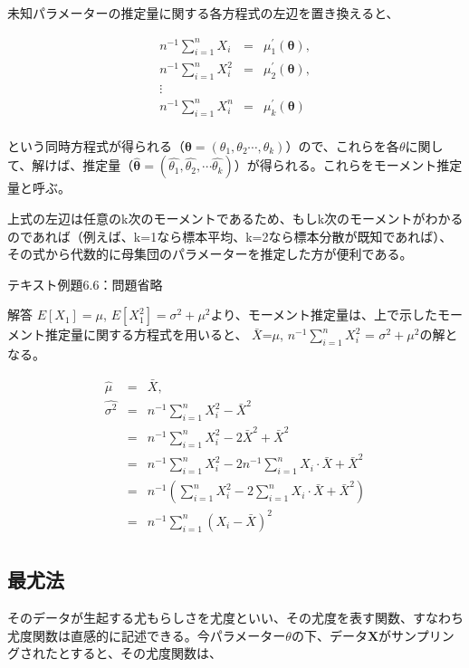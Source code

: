 \documentclass[a4paper,uplatex]{jsarticle}
\begin{document}
未知パラメーターの推定量に関する各方程式の左辺を置き換えると、

\begin{eqnarray*}
  n^{-1}\sum_{i=1}^{n}X_{i} & = & \mu_{1}^{\prime}(\bm{\theta}),  \\
  n^{-1}\sum_{i=1}^{n}X_{i}^{2} & = & \mu_{2}^{\prime}(\bm{\theta}), \\
  \vdots \\
  n^{-1}\sum_{i=1}^{n}X_{i}^{n} & = & \mu_{k}^{\prime}(\bm{\theta}) \\
\end{eqnarray*}

という同時方程式が得られる（$\bm{\theta}=(\theta_1, \theta_2 \cdots ,\theta_k)$）ので、これらを各$\theta$に関して、解けば、推定量（$\bm{\hat{\theta}}=(\hat{\theta_1}, \hat{\theta_2}, \cdots \hat{\theta_k})$）が得られる。これらをモーメント推定量と呼ぶ。

上式の左辺は任意のk次のモーメントであるため、もしk次のモーメントがわかるのであれば（例えば、k=1なら標本平均、k=2なら標本分散が既知であれば）、その式から代数的に母集団のパラメーターを推定した方が便利である。

\vspace{\baselineskip}
テキスト例題6.6：問題省略

\begin{itembox}[c]{解答}
  $E[X_1]=\mu$,  $E[X_1^2]=\sigma^2+\mu^2$より、モーメント推定量は、上で示したモーメント推定量に関する方程式を用いると、
  $\bar{X}$=$\mu$, $n^{-1}\sum_{i=1}^{n}X_{i}^2$ = $\sigma^2 + \mu^2$の解となる。

\begin{eqnarray*}
\hat{\mu} &=& \bar{X},\\
\hat{\sigma^2} &=& n^{-1}\sum_{i=1}^{n}X_{i}^2 - \bar{X}^2 \\
&=& n^{-1}\sum_{i=1}^{n}X_{i}^2 -2 \bar{X}^2 + \bar{X}^2 \\
&=& n^{-1}\sum_{i=1}^{n}X_{i}^2 -2 n^{-1}\sum_{i=1}^{n}X_{i} \cdot \bar{X} + \bar{X}^2 \\
&=& n^{-1} (\sum_{i=1}^{n}X_{i}^2 - 2 \sum_{i=1}^{n}X_{i} \cdot \bar{X} + \bar{X}^2 ) \\
&=& n^{-1} \sum_{i=1}^{n} (X_{i}-\bar{X})^2 \\
\end{eqnarray*}
\end{itembox}

\subsection{最尤法}
そのデータが生起する尤もらしさを尤度といい、その尤度を表す関数、すなわち尤度関数は直感的に記述できる。今パラメーター$\theta$の下、データ$\bm{X}$がサンプリングされたとすると、その尤度関数は、
\end{document}
